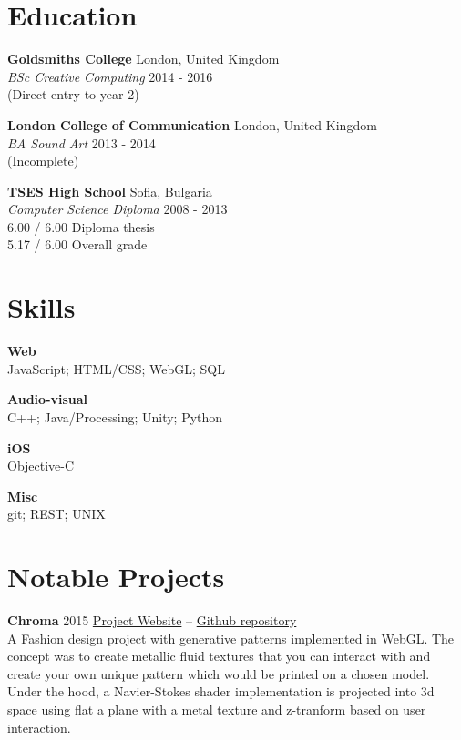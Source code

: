 \documentclass[margin,line,a4paper]{resume}
\begin{document}
\begin{resume}
\section{\mysidestyle Education}

\textbf{Goldsmiths College} \hfill London, United Kingdom\vspace{0.5mm}\\
\textsl{BSc Creative Computing } \hfill 2014 - 2016 \vspace{1mm} \\
(Direct entry to year 2)

\textbf{London College of Communication} \hfill London, United Kingdom\vspace{0.5mm}\\
\textsl{BA Sound Art } \hfill 2013 - 2014 \vspace{1mm} \\
(Incomplete)

\textbf{TSES High School} \hfill Sofia, Bulgaria \vspace{0.5mm} \\
\textsl{Computer Science Diploma} \hfill 2008 - 2013 \vspace{0.5mm} \\
6.00 / 6.00 Diploma thesis \\
5.17 / 6.00 Overall grade \\

\section{\mysidestyle Skills}
\textbf{Web} \\
JavaScript; HTML/CSS; WebGL; SQL

\textbf{Audio-visual} \\
C++; Java/Processing; Unity; Python

\textbf{iOS} \\
Objective-C

\textbf{Misc} \\
git; REST; UNIX

\newpage

\section{\mysidestyle Notable Projects}
\textbf{Chroma} 2015 \hfill
\href{http://chromaproject.co}{Project Website} --
\href{https://github.com/nicknikolov/chroma}{Github repository} \\
A Fashion design project with generative patterns implemented in WebGL. The concept was to create metallic fluid textures that you can interact with and create your own unique pattern which would be printed on a chosen model.
Under the hood, a Navier-Stokes shader implementation is projected into 3d space using flat a plane with a metal texture and z-tranform based on user interaction.


\end{resume}
\end{document}

